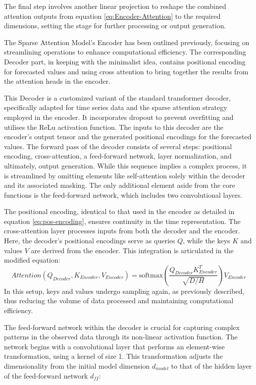 \documentclass{article}
\begin{document}
The final step involves another linear projection to reshape the combined attention outputs from equation \ref{eq:Encoder-Attention} to the required dimensions, setting the stage for further processing or output generation.

The Sparse Attention Model's Encoder has been outlined previously, focusing on streamlining operations to enhance computational efficiency. The corresponding Decoder part, in keeping with the minimalist idea, contains positional encoding for forecasted values and using cross attention to bring together the results from the attention heads in the encoder.

This Decoder is a customized variant of the standard transformer decoder, specifically adapted for time series data and the sparse attention strategy employed in the encoder. It incorporates dropout to prevent overfitting and utilises the ReLu activation function. The inputs to this decoder are the encoder's output tensor and the generated positional encodings for the forecasted values. The forward pass of the decoder consists of several steps: positional encoding, cross-attention, a feed-forward network, layer normalization, and ultimately, output generation. While this sequence implies a complex process, it is streamlined by omitting elements like self-attention solely within the decoder and its associated masking. The only additional element aside from the core functions is the feed-forward network, which includes two convolutional layers.

The positional encoding, identical to that used in the encoder as detailed in equation \ref{eq:pos-encoding}, ensures continuity in the time representation. The cross-attention layer processes inputs from both the decoder and the encoder. Here, the decoder's positional encodings serve as queries $Q$, while the keys $K$ and values $V$ are derived from the encoder. This integration is articulated in the modified equation:
\begin{equation}\label{eq:Decoder-CrossAttention}
    Attention(Q_{Decoder}, K_{Encoder}, V_{Encoder}) = \text{softmax} \left( \frac{Q_{Decoder} K_{Encoder}^T}{\sqrt{D / H}} \right) V_{Encoder}
\end{equation}
In this setup, keys and values undergo sampling again, as previously described, thus reducing the volume of data processed and maintaining computational efficiency.

The feed-forward network within the decoder is crucial for capturing complex patterns in the observed data through its non-linear activation function. The network begins with a convolutional layer that performs an element-wise transformation, using a kernel of size 1. This transformation adjusts the dimensionality from the initial model dimension $d_{model}$ to that of the hidden layer of the feed-forward network $d_{ff}$:
\end{document}
